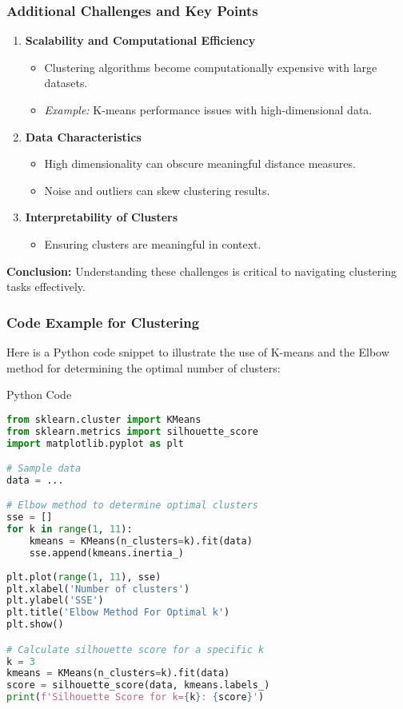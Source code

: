 \documentclass{beamer}
\begin{document}
\begin{frame}[fragile]
    \frametitle{Additional Challenges and Key Points}
    \begin{enumerate}[resume]
        \item \textbf{Scalability and Computational Efficiency}
            \begin{itemize}
                \item Clustering algorithms become computationally expensive with large datasets.
                \item \textit{Example:} K-means performance issues with high-dimensional data.
            \end{itemize}

        \item \textbf{Data Characteristics}
            \begin{itemize}
                \item High dimensionality can obscure meaningful distance measures.
                \item Noise and outliers can skew clustering results.
            \end{itemize}

        \item \textbf{Interpretability of Clusters}
            \begin{itemize}
                \item Ensuring clusters are meaningful in context.
            \end{itemize}
    \end{enumerate}
    
    \textbf{Conclusion:} Understanding these challenges is critical to navigating clustering tasks effectively.
\end{frame}

\begin{frame}[fragile]
    \frametitle{Code Example for Clustering}
    Here is a Python code snippet to illustrate the use of K-means and the Elbow method for determining the optimal number of clusters:
    \begin{block}{Python Code}
        \begin{lstlisting}[language=Python]
from sklearn.cluster import KMeans
from sklearn.metrics import silhouette_score
import matplotlib.pyplot as plt

# Sample data
data = ...

# Elbow method to determine optimal clusters
sse = []
for k in range(1, 11):
    kmeans = KMeans(n_clusters=k).fit(data)
    sse.append(kmeans.inertia_)
    
plt.plot(range(1, 11), sse)
plt.xlabel('Number of clusters')
plt.ylabel('SSE')
plt.title('Elbow Method For Optimal k')
plt.show()

# Calculate silhouette score for a specific k
k = 3
kmeans = KMeans(n_clusters=k).fit(data)
score = silhouette_score(data, kmeans.labels_)
print(f'Silhouette Score for k={k}: {score}')
        \end{lstlisting}
    \end{block}
\end{frame}
\end{document}
